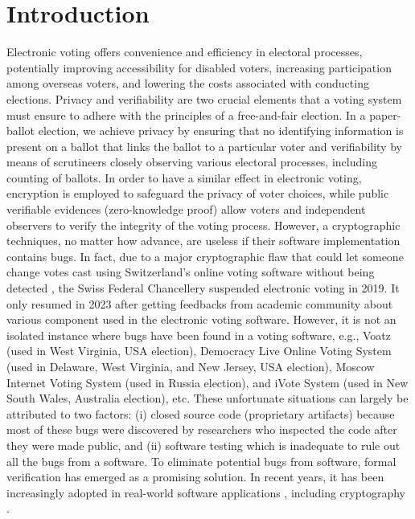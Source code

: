 \documentclass[conference,compsoc]{IEEEtran}
\begin{document}
\section{Introduction}
Electronic voting offers convenience and efficiency in electoral processes, 
potentially improving accessibility for disabled voters, increasing participation 
among overseas voters, and lowering the costs associated with conducting elections.
Privacy and verifiability are two crucial elements that a voting system 
must ensure to adhere with the principles of a free-and-fair election.  
In a paper-ballot election, we achieve privacy by ensuring that 
no identifying information is present on a ballot that links the ballot to a particular voter
and verifiability by means of scrutineers closely observing various electoral 
processes, including counting of ballots. In order to have a similar effect in electronic 
voting, encryption is employed to safeguard the privacy 
of voter choices, while public verifiable evidences (zero-knowledge proof)
allow voters and independent observers to verify the integrity 
of the voting process. However, a cryptographic techniques, no matter how 
advance,  are useless if their software implementation contains bugs. 
In fact, due to a major cryptographic flaw that
could let someone change votes cast using Switzerland's online 
voting software without being detected  \cite{9152765}, the Swiss Federal Chancellery suspended electronic voting in 
2019. It only resumed in 2023 after getting feedbacks from academic 
community \cite{swiss_evoting_chronik} about various component used in 
the electronic voting software. However, it is not an isolated  
instance where bugs have been found in a voting software, e.g., 
Voatz \cite{255334} (used in West Virginia, USA election),
Democracy Live Online Voting System \cite{263858} 
(used in Delaware, West Virginia, and New Jersey, USA election), 
Moscow Internet Voting System \cite{10.1007/978-3-030-51280-4_3}
(used in Russia election), and iVote System \cite{10.1007/978-3-319-22270-7_3, 10.1145/3014812.3014837} 
(used in New South Wales, Australia election), etc. 
These unfortunate situations can largely be attributed to two factors: 
(i) closed source code (proprietary artifacts) because most of these bugs were 
discovered by researchers who inspected the code after they were made public, and 
(ii) software testing which is inadequate to rule out all the bugs 
from a software. To eliminate potential bugs from software, formal verification has 
emerged as a promising solution. In recent years, it has been increasingly 
adopted in real-world software applications \cite{10.1145/1111037.1111042}, 
including cryptography \cite{8835346,10.1145/3133956.3134043,190894,10.1145/2701415,
10.1145/2660267.2660370,10.1145/3319535.3363211}.
\end{document}
